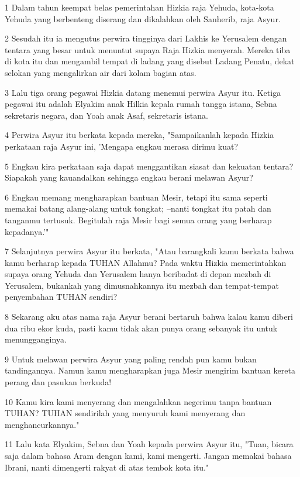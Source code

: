 \par 1 Dalam tahun keempat belas pemerintahan Hizkia raja Yehuda, kota-kota Yehuda yang berbenteng diserang dan dikalahkan oleh Sanherib, raja Asyur.
\par 2 Sesudah itu ia mengutus perwira tingginya dari Lakhis ke Yerusalem dengan tentara yang besar untuk menuntut supaya Raja Hizkia menyerah. Mereka tiba di kota itu dan mengambil tempat di ladang yang disebut Ladang Penatu, dekat selokan yang mengalirkan air dari kolam bagian atas.
\par 3 Lalu tiga orang pegawai Hizkia datang menemui perwira Asyur itu. Ketiga pegawai itu adalah Elyakim anak Hilkia kepala rumah tangga istana, Sebna sekretaris negara, dan Yoah anak Asaf, sekretaris istana.
\par 4 Perwira Asyur itu berkata kepada mereka, "Sampaikanlah kepada Hizkia perkataan raja Asyur ini, 'Mengapa engkau merasa dirimu kuat?
\par 5 Engkau kira perkataan saja dapat menggantikan siasat dan kekuatan tentara? Siapakah yang kauandalkan sehingga engkau berani melawan Asyur?
\par 6 Engkau memang mengharapkan bantuan Mesir, tetapi itu sama seperti memakai batang alang-alang untuk tongkat; --nanti tongkat itu patah dan tanganmu tertusuk. Begitulah raja Mesir bagi semua orang yang berharap kepadanya.'"
\par 7 Selanjutnya perwira Asyur itu berkata, "Atau barangkali kamu berkata bahwa kamu berharap kepada TUHAN Allahmu? Pada waktu Hizkia memerintahkan supaya orang Yehuda dan Yerusalem hanya beribadat di depan mezbah di Yerusalem, bukankah yang dimusnahkannya itu mezbah dan tempat-tempat penyembahan TUHAN sendiri?
\par 8 Sekarang aku atas nama raja Asyur berani bertaruh bahwa kalau kamu diberi dua ribu ekor kuda, pasti kamu tidak akan punya orang sebanyak itu untuk menungganginya.
\par 9 Untuk melawan perwira Asyur yang paling rendah pun kamu bukan tandingannya. Namun kamu mengharapkan juga Mesir mengirim bantuan kereta perang dan pasukan berkuda!
\par 10 Kamu kira kami menyerang dan mengalahkan negerimu tanpa bantuan TUHAN? TUHAN sendirilah yang menyuruh kami menyerang dan menghancurkannya."
\par 11 Lalu kata Elyakim, Sebna dan Yoah kepada perwira Asyur itu, "Tuan, bicara saja dalam bahasa Aram dengan kami, kami mengerti. Jangan memakai bahasa Ibrani, nanti dimengerti rakyat di atas tembok kota itu."
